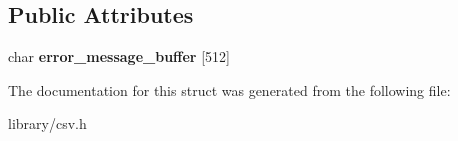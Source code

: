 \subsection*{Public Attributes}
\begin{DoxyCompactItemize}
\item 
\mbox{\label{structio_1_1error_1_1base_a3be516c4636b7b61133968cb8081c885}} 
char {\bfseries error\+\_\+message\+\_\+buffer} \mbox{[}512\mbox{]}
\end{DoxyCompactItemize}


The documentation for this struct was generated from the following file\+:\begin{DoxyCompactItemize}
\item 
library/csv.\+h\end{DoxyCompactItemize}
